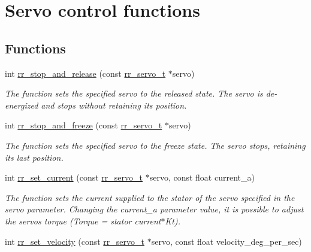 \hypertarget{group___servo__control}{}\section{Servo control functions}
\label{group___servo__control}
\subsection*{Functions}
\begin{DoxyCompactItemize}
\item 
int \hyperlink{group___servo__control_ga4bc3f475fd951403fbd99e51dc3aba4a}{rr\+\_\+stop\+\_\+and\+\_\+release} (const \hyperlink{structrr__servo__t}{rr\+\_\+servo\+\_\+t} $\ast$servo)
\begin{DoxyCompactList}\small\item\em The function sets the specified servo to the released state. The servo is de-\/energized and stops without retaining its position. \end{DoxyCompactList}\item 
int \hyperlink{group___servo__control_gabc7b250aba6f86e29692957eac9ecb31}{rr\+\_\+stop\+\_\+and\+\_\+freeze} (const \hyperlink{structrr__servo__t}{rr\+\_\+servo\+\_\+t} $\ast$servo)
\begin{DoxyCompactList}\small\item\em The function sets the specified servo to the freeze state. The servo stops, retaining its last position. \end{DoxyCompactList}\item 
int \hyperlink{group___servo__control_gac25d20b331b1b985c1f6f50106d5c971}{rr\+\_\+set\+\_\+current} (const \hyperlink{structrr__servo__t}{rr\+\_\+servo\+\_\+t} $\ast$servo, const float current\+\_\+a)
\begin{DoxyCompactList}\small\item\em The function sets the current supplied to the stator of the servo specified in the \textquotesingle{}servo\textquotesingle{} parameter. Changing the \textquotesingle{}current\+\_\+a parameter\textquotesingle{} value, it is possible to adjust the servo\textquotesingle{}s torque (Torque = stator current$\ast$\+Kt). \end{DoxyCompactList}\item 
int \hyperlink{group___servo__control_gaf790a253c11e2bc0bfb208dd26e7491c}{rr\+\_\+set\+\_\+velocity} (const \hyperlink{structrr__servo__t}{rr\+\_\+servo\+\_\+t} $\ast$servo, const float velocity\+\_\+deg\+\_\+per\+\_\+sec)

\end{DoxyCompactItemize}
